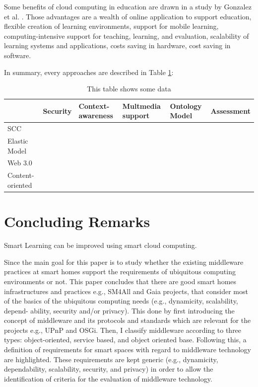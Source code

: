 \documentclass[journal]{vgtc}                %
\begin{document}
Some benefits of cloud computing in education are drawn in a study by Gonzalez et al. \cite{Gonzalez-Martinez2014}. Those advantages are a wealth of online application to support education, flexible creation of learning environments, support for mobile learning, computing-intensive support for teaching, learning, and evaluation, scalability of learning systems and applications, costs saving in hardware, cost saving in software.






In summary, every approaches are described in Table \ref{tab:comparison}:

\begin{table}[htb]
\centering
\caption{This table shows some data}
\label{tab:comparison}
\scriptsize
\begin{tabular}{llllll}
 & Security & Context-awareness & Multmedia support & Ontology Model & Assessment \\
\hline
SCC &  &  &  &  &  \\
Elastic Model &  &  &  &  &  \\
Web 3.0 &  &  &  &  &  \\
Content-oriented &  &  &  &  & 
\end{tabular}
\end{table}


\section{Concluding Remarks}
Smart Learning can be improved using smart cloud computing.

Since the main goal for this paper is to study whether the existing middleware practices at smart homes support the requirements of ubiquitous computing environments or not. This paper concludes that there are good smart homes infrastructures and practices e.g., SM4All and Gaia projects, that consider most of the basics of the ubiquitous computing needs (e.g., dynamicity, scalability, depend- ability, security and/or privacy). This done by first introducing the concept of middleware and its protocols and standards which are relevant for the projects e.g., UPnP and OSGi. Then, I classify middleware according to three types: object-oriented, service based, and object oriented base. Following this, a definition of requirements for smart spaces with regard to middleware technology are highlighted. These requirements are kept generic (e.g., dynamicity, dependability, scalability, security, and privacy) in order to allow the identification of criteria for the evaluation of middleware technology.
\end{document}
